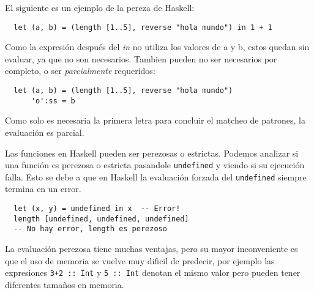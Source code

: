 El siguiente es un ejemplo de la pereza de Haskell:

\begin{lstlisting}
  let (a, b) = (length [1..5], reverse "hola mundo") in 1 + 1
\end{lstlisting}

Como la expresión después del \textit{in} no utiliza los valores de a y b,
estos quedan sin evaluar, ya que no son necesarios. Tambien pueden no ser
necesarios por completo, o ser \textit{parcialmente} requeridos:

\begin{lstlisting}
  let (a, b) = (length [1..5], reverse "hola mundo")
      'o':ss = b
\end{lstlisting}

Como solo es necesaria la primera letra para concluir el matcheo de
patrones, la evaluación es parcial.

Las funciones en Haskell pueden ser perezosas o estrictas. Podemos analizar
si una función es perezosa o estricta pasandole \lstinline$undefined$ y viendo
si su ejecución falla. Esto se debe a que en Haskell la evaluación forzada del
\lstinline$undefined$ siempre termina en un error.

\begin{lstlisting}
  let (x, y) = undefined in x  -- Error!
  length [undefined, undefined, undefined]
  -- No hay error, length es perezoso
\end{lstlisting}


La evaluación perezosa tiene muchas ventajas, pero su mayor inconveniente es
que el uso de memoria se vuelve muy dificil de predecir, por ejemplo las
expresiones \lstinline$3+2 :: Int$ y \lstinline$5 :: Int$ denotan el mismo
valor pero pueden tener diferentes tamaños en memoria.

